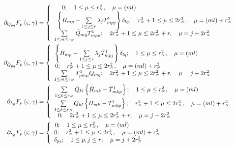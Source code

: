 \documentclass[aps,preprint]{revtex4}%
\begin{document}
\begin{align}
\partial_{Q_{pq}}F_{\mu}\left(  \varsigma,\gamma\right)   &  =\left\{
\begin{array}
[c]{c}%
0;\quad1\leq\mu\leq r_{^{N}}^{2},\quad\mu=\left(  ml\right)  \qquad
\qquad\qquad\qquad\qquad\qquad\qquad\qquad\\
\left\{  H_{mp}-\sum\limits_{1\leq j\leq r}\lambda_{j}T_{mpj}^{1}\right\}
\delta_{lq};\quad r_{^{N}}^{2}+1\leq\mu\leq2r_{^{N}}^{2},\quad\mu=\left(
ml\right)  +r_{^{N}}^{2}\quad\\
\sum\limits_{1\leq m\leq r_{N}}\bar{Q}_{mq}T_{mp\mu}^{1};\quad2r_{^{N}}%
^{2}+1\leq\mu\leq2r_{^{N}}^{2}+r,\quad\mu=j+2r_{^{N}}^{2}\quad\quad\quad
\quad\quad
\end{array}
\right. \nonumber\\
\partial_{\bar{Q}_{pq}}F_{\mu}\left(  \varsigma,\gamma\right)   &  =\left\{
\begin{array}
[c]{c}%
\left\{  \bar{H}_{mp}-\sum\limits_{1\leq j\leq r}\lambda_{j}\bar{T}_{mpj}%
^{1}\right\}  \delta_{lq};\quad1\leq\mu\leq r_{^{N}}^{2},\quad\mu=\left(
ml\right)  \qquad\qquad\qquad\quad\quad\\
0;\quad r_{^{N}}^{2}+1\leq\mu\leq2r_{^{N}}^{2},\quad\mu=\left(  ml\right)
+r_{^{N}}^{2}\qquad\qquad\qquad\qquad\qquad\qquad\qquad\\
\sum\limits_{1\leq m\leq r_{N}}T_{pm\mu}^{1}Q_{mq};\quad2r_{^{N}}^{2}+1\leq
\mu\leq2r_{^{N}}^{2}+r,\quad\mu=j+2r_{^{N}}^{2}\qquad\qquad\qquad
\end{array}
\right. \nonumber\\
\partial_{\lambda_{p}}F_{\mu}\left(  \varsigma,\gamma\right)   &  =\left\{
\begin{array}
[c]{c}%
\sum\limits_{1\leq k\leq r_{N}}\bar{Q}_{kl}\left\{  \bar{H}_{mk}-\bar{T}%
_{mkp}^{1}\right\}  ;\quad1\leq\mu\leq r_{^{N}}^{2},\quad\mu=\left(
ml\right)  \quad\quad\quad\quad\quad\\
\sum\limits_{1\leq k\leq r_{N}}Q_{kl}\left\{  H_{mk}-T_{mkp}^{1}\right\}
;\quad r_{^{N}}^{2}+1\leq\mu\leq2r_{^{N}}^{2},\quad\mu=\left(  ml\right)
+r_{^{N}}^{2}\\
0;\quad2r_{^{N}}^{2}+1\leq\mu\leq2r_{^{N}}^{2}+r,\quad\mu=j+2r_{^{N}}^{2}%
\quad\quad\quad\quad\quad\quad\quad\quad\quad
\end{array}
\right. \nonumber\\
\partial_{\gamma_{p}}F_{\mu}\left(  \varsigma,\gamma\right)   &  =\left\{
\begin{array}
[c]{c}%
0;\quad1\leq\mu\leq r_{^{N}}^{2},\quad\mu=\left(  ml\right)  \quad\quad
\quad\quad\quad\\
0;\quad r_{^{N}}^{2}+1\leq\mu\leq2r_{^{N}}^{2},\quad\mu=\left(  ml\right)
+r_{^{N}}^{2}\\
\delta_{pj};\quad1\leq p,j\leq r;\quad\mu=j+2r_{^{N}}^{2}\quad\quad\quad
\end{array}
\right.
\end{align}
\end{document}
